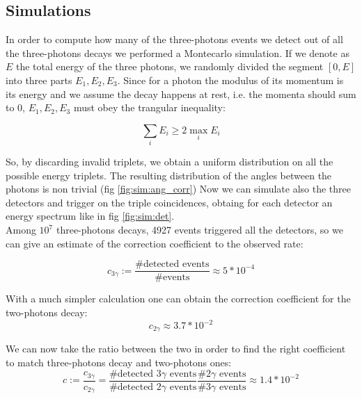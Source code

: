 \documentclass[main.tex]{subfiles}
\begin{document}
\subsection{Simulations}

In order to compute how many of the three-photons events we detect out of all the three-photons decays we performed a Montecarlo simulation. If we denote as $E$ the total energy of the three photons, we randomly divided the segment $[0,E]$ into three parts $E_1,E_2,E_3$. Since for a photon the modulus of its momentum is its energy and we assume the decay happens at rest, i.e. the momenta should sum to 0, $E_1,E_2,E_3$ must obey the trangular inequality:

\begin{equation}
  \sum_i E_i \geq 2 \max_i E_i
\end{equation}


So, by discarding invalid triplets, we obtain a uniform distribution on all the possible energy triplets. The resulting distribution of the angles between the photons is non trivial (fig \ref{fig:sim:ang_corr})
Now we can simulate also the three detectors and trigger on the triple coincidences, obtaing for each detector an energy spectrum like in fig \ref{fig:sim:det}.\\
Among $10^7$ three-photons decays, 4927 events triggered all the detectors, so we can give an estimate of the correction coefficient to the observed rate:

\begin{equation*}
  c_{3\gamma} := \frac{\text{\# detected events}}{\text{\# events}} \approx 5*10^{-4}
\end{equation*}

With a much simpler calculation one can obtain the correction coefficient for the two-photons decay:
\begin{equation*}
  c_{2\gamma} \approx 3.7*10^{-2}
\end{equation*}

We can now take the ratio between the two in order to find the right coefficient to match three-photons decay and two-photons ones:
\begin{equation*}
  c := \frac{c_{3\gamma}}{c_{2\gamma}} = \frac{\text{\# detected 3$\gamma$ events}}{\text{\# detected 2$\gamma$ events}} \frac{\text{\# 2$\gamma$ events}}{\text{\# 3$\gamma$ events}} \approx 1.4*10^{-2}
\end{equation*}
\end{document}

